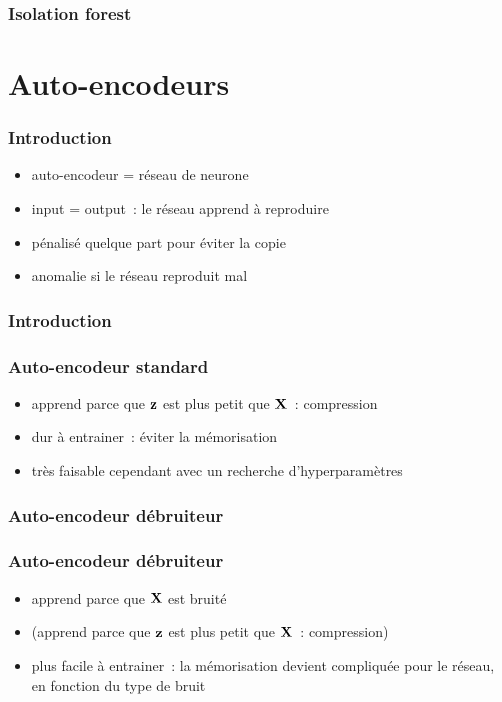 \documentclass{formation}
\begin{document}
\begin{frame}
  \frametitle{Isolation forest}
\end{frame}

\section{Auto-encodeurs}

\begin{frame}
  \frametitle{Introduction}

  \begin{itemize}[<+->]
  \item auto-encodeur = réseau de neurone
  \item input = output : le réseau apprend à reproduire
  \item pénalisé quelque part pour éviter la copie
  \item anomalie si le réseau reproduit mal
  \end{itemize}
\end{frame}

\begin{frame}
  \frametitle{Introduction}
\end{frame}

\begin{frame}
  \frametitle{Auto-encodeur \og standard\fg}

  \begin{itemize}
  \item apprend parce que $\vect{z}$ est plus petit que $\vect{X}$ :
    compression
  \item dur à entrainer : éviter la mémorisation
  \item très faisable cependant avec un recherche d'hyperparamètres
  \end{itemize}
\end{frame}

\begin{frame}
  \frametitle{Auto-encodeur débruiteur}

\end{frame}

\begin{frame}
  \frametitle{Auto-encodeur débruiteur}
  \begin{itemize}
  \item apprend parce que $\vect{X}$ est bruité
  \item (apprend parce que $\vect{z}$ est plus petit que $\vect{X}$ :
    compression)
  \item plus facile à entrainer : la mémorisation devient compliquée
    pour le réseau, en fonction du type de bruit
  \end{itemize}
\end{frame}
\end{document}
